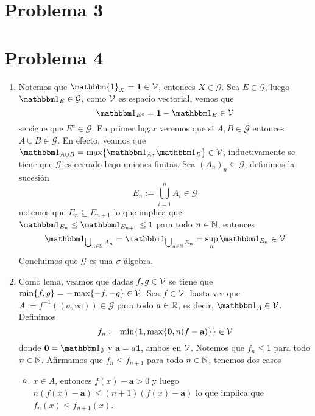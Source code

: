 \documentclass{article}
\begin{document}
\section*{Problema 3}
\section*{Problema 4}
\begin{enumerate}
    \item Notemos que $\mathbbm{1}_{X}=\textbf{1}\in\V$, entonces $X\in\mathcal{G}$. Sea 
    $E\in\mathcal{G}$, luego $\I_{E}\in\mathcal{G}$, como $\mathcal{V}$ es espacio vectorial, vemos que
    \begin{equation*}
        \I_{E^{c}}=\textbf{1}-\I_{E}\in\V
    \end{equation*}
    se sigue que $E^{c}\in\mathcal{G}$. En primer lugar veremos que si $A,B\in\mathcal{G}$ entonces
    $A\cup B\in\mathcal{G}$. En efecto, veamos que $\I_{A\cup B}=\max\{\I_{A},\I_{B}\}\in\V$,
    inductivamente se tiene que $\mathcal{G}$ es cerrado bajo uniones finitas. Sea $(A_{n})_{n}
    \subseteq\mathcal{G}$, definimos la sucesión
    \begin{equation*}
        E_{n}:=\bigcup_{i=1}^{n}A_{i}\in\mathcal{G}
    \end{equation*}
    notemos que $E_{n}\subseteq E_{n+1}$ lo que implica que $\I_{E_{n}}\leq\I_{E_{n+1}}\leq1$ para
    todo $n\in\mathbb{N}$, entonces
    \begin{equation*}
        \I_{\bigcup_{n\in\N}A_{n}}=\I_{\bigcup_{n\in\N}E_{n}}=\sup_{n}\I_{E_{n}}\in\V
    \end{equation*}
    Concluimos que $\mathcal{G}$ es una $\sigma$-álgebra.

    \item Como lema, veamos que dadas $f,g\in\mathcal{V}$ se tiene que $\min\{f,g\}=-\max\{-f,-g\}\in\mathcal{V}$. 
    Sea $f\in\mathcal{V}$, basta ver que $A:=f^{-1}((a,\infty))\in\mathcal{G}$ para todo $a\in\mathbb{R}$, es decir,
    $\I_{A}\in\V$. Definimos
    \begin{equation*}
        f_{n}:=\min\{\textbf{1},\max\{\textbf{0},n(f-\textbf{a})\}\}\in\mathcal{V}
    \end{equation*}
    donde $\textbf{0}=\I_{\emptyset}$ y $\textbf{a}=a\textbf{1}$, ambos en $\mathcal{V}$. Notemos que 
    $f_{n}\leq1$ para todo $n\in\mathbb{N}$. Afirmamos que $f_{n}\leq f_{n+1}$ para todo $n\in\mathbb{N}$, tenemos
    dos casos
    \begin{itemize}
        \item $x\in A$, entonces $f(x)-\textbf{a}>0$ y luego $n(f(x)-\textbf{a})\leq(n+1)
        (f(x)-\textbf{a})$ lo que implica que $f_{n}(x)\leq f_{n+1}(x)$.


\end{itemize}
\end{enumerate}
\end{document}
